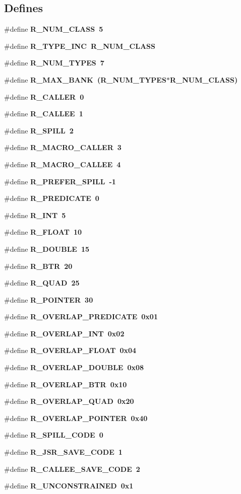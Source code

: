\subsection*{Defines}
\begin{CompactItemize}
\item 
\#define \bf{R\_\-NUM\_\-CLASS}~5
\item 
\#define \bf{R\_\-TYPE\_\-INC}~R\_\-NUM\_\-CLASS
\item 
\#define \bf{R\_\-NUM\_\-TYPES}~7
\item 
\#define \bf{R\_\-MAX\_\-BANK}~(R\_\-NUM\_\-TYPES$\ast$R\_\-NUM\_\-CLASS)
\item 
\#define \bf{R\_\-CALLER}~0
\item 
\#define \bf{R\_\-CALLEE}~1
\item 
\#define \bf{R\_\-SPILL}~2
\item 
\#define \bf{R\_\-MACRO\_\-CALLER}~3
\item 
\#define \bf{R\_\-MACRO\_\-CALLEE}~4
\item 
\#define \bf{R\_\-PREFER\_\-SPILL}~-1
\item 
\#define \bf{R\_\-PREDICATE}~0
\item 
\#define \bf{R\_\-INT}~5
\item 
\#define \bf{R\_\-FLOAT}~10
\item 
\#define \bf{R\_\-DOUBLE}~15
\item 
\#define \bf{R\_\-BTR}~20
\item 
\#define \bf{R\_\-QUAD}~25
\item 
\#define \bf{R\_\-POINTER}~30
\item 
\#define \bf{R\_\-OVERLAP\_\-PREDICATE}~0x01
\item 
\#define \bf{R\_\-OVERLAP\_\-INT}~0x02
\item 
\#define \bf{R\_\-OVERLAP\_\-FLOAT}~0x04
\item 
\#define \bf{R\_\-OVERLAP\_\-DOUBLE}~0x08
\item 
\#define \bf{R\_\-OVERLAP\_\-BTR}~0x10
\item 
\#define \bf{R\_\-OVERLAP\_\-QUAD}~0x20
\item 
\#define \bf{R\_\-OVERLAP\_\-POINTER}~0x40
\item 
\#define \bf{R\_\-SPILL\_\-CODE}~0
\item 
\#define \bf{R\_\-JSR\_\-SAVE\_\-CODE}~1
\item 
\#define \bf{R\_\-CALLEE\_\-SAVE\_\-CODE}~2
\item 
\#define \bf{R\_\-UNCONSTRAINED}~0x1
\item 

\end{CompactItemize}
